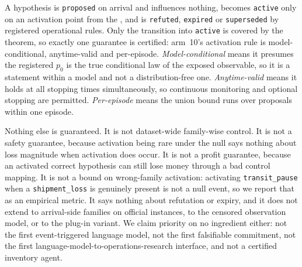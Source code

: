 A hypothesis is \texttt{proposed} on arrival and influences nothing, becomes
\texttt{active} only on an activation point from the \eprocess{}, and is
\texttt{refuted}, \texttt{expired} or \texttt{superseded} by registered
operational rules. Only the transition into \texttt{active} is covered by the
theorem, so exactly one guarantee is certified: arm~10's activation rule is
model-conditional, anytime-valid and per-episode. \emph{Model-conditional} means
it presumes the registered $p_0$ is the true conditional law of the exposed
observable, so it is a statement within a model and not a distribution-free one.
\emph{Anytime-valid} means it holds at all stopping times simultaneously, so
continuous monitoring and optional stopping are permitted. \emph{Per-episode}
means the union bound runs over proposals within one episode.

Nothing else is guaranteed. It is not dataset-wide family-wise control. It is not
a safety guarantee, because activation being rare under the null says nothing
about loss magnitude when activation does occur. It is not a profit guarantee,
because an activated correct hypothesis can still lose money through a bad
control mapping. It is not a bound on wrong-family activation: activating
\texttt{transit\_pause} when a \texttt{shipment\_loss} is genuinely present is
not a null event, so we report that as an empirical metric. It says nothing about
refutation or expiry, and it does not extend to arrival-side families on official
instances, to the censored observation model, or to the plug-in variant. We claim priority on no
ingredient either: not the first event-triggered language model, not the first
falsifiable commitment, not the first language-model-to-operations-research
interface, and not a certified inventory agent.
